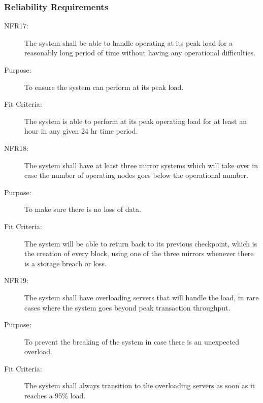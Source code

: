 \documentclass[a4paper,twoside,phd]{BYUPhys}
\begin{document}
\subsubsection{Reliability Requirements}
\begin{description}
\item[NFR17:] The system shall be able to handle operating at its peak load for a reasonably long period of time without having any operational difficulties.
\item[Purpose:] To ensure the system can perform at its peak load.
\item[Fit Criteria:] The system is able to perform at its peak operating load for at least an hour in any given 24 hr time period.
\item[NFR18:] The system shall have at least three mirror systems which will take over in case the number of operating nodes goes below the operational number.
\item[Purpose:] To make sure there is no loss of data.
\item[Fit Criteria:] The system will be able to return back to its previous checkpoint, which is the creation of every block, using one of the three mirrors whenever there is a storage breach or loss.
\item[NFR19:] The  system  shall  have  overloading  servers  that  will  handle  the  load,  in  rare cases where the system goes beyond peak transaction throughput.
\item[Purpose:] To prevent the breaking of the system in case there is an unexpected overload.
\item[Fit Criteria:] The system shall always transition to the overloading servers as soon as it reaches a 95\% load.
\end{description}
\end{document}
